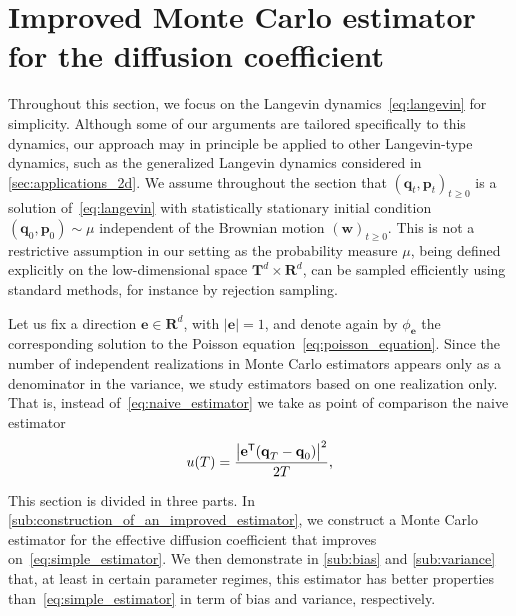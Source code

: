 \documentclass[11pt,a4paper]{article}
\newcommand{\real}{\mathbf R}
\newcommand{\torus}{\mathbf T}
\newcommand{\vect}[1]{\boldsymbol{\mathbf #1}}
\renewcommand{\t}{\mathsf T}
\theoremstyle{plain}
\numberwithin{equation}{section}
\renewcommand{\geq}{\geqslant}
\begin{document}
\section{Improved Monte Carlo estimator for the diffusion coefficient}%
\label{sec:method}%

Throughout this section,
we focus on the Langevin dynamics~\eqref{eq:langevin} for simplicity.
Although some of our arguments are tailored specifically to this dynamics,
our approach may in principle be applied to other Langevin-type dynamics,
such as the generalized Langevin dynamics considered in \cref{sec:applications_2d}.
We assume throughout the section that $(\vect q_t, \vect p_t)_{t\geq 0}$ is a solution of~\eqref{eq:langevin} with statistically stationary initial condition~$(\vect q_0, \vect p_0) \sim \mu$ independent of the Brownian motion $(\vect w)_{t \geq 0}$.
This is not a restrictive assumption in our setting as the probability measure $\mu$,
being defined explicitly on the low-dimensional space $\torus^d \times \real^d$,
can be sampled efficiently using standard methods,
for instance by rejection sampling.

Let us fix a direction $\vect e \in \real^d$, with $|\vect e| = 1$,
and denote again by $\phi_{\vect e}$ the corresponding solution to the Poisson equation~\eqref{eq:poisson_equation}.
Since the number of independent realizations in Monte Carlo estimators
appears only as a denominator in the variance,
we study estimators based on one realization only.
That is, instead of~\eqref{eq:naive_estimator} we take as point of comparison the naive estimator
\begin{equation}
    \label{eq:simple_estimator}
    u(T) = \frac{\abs{\vect e^\t (\vect q_T - \vect q_0)}^2}{2T},
\end{equation}

This section is divided in three parts.
In \cref{sub:construction_of_an_improved_estimator},
we construct a Monte Carlo estimator for the effective diffusion coefficient that improves on~\eqref{eq:simple_estimator}.
We then demonstrate in \cref{sub:bias} and \cref{sub:variance} that,
at least in certain parameter regimes,
this estimator has better properties than~\eqref{eq:simple_estimator} in term of bias and variance, respectively.
\end{document}
